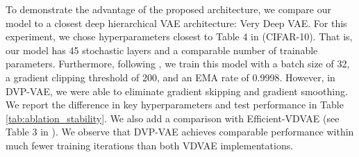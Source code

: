 To demonstrate the advantage of the proposed architecture, we compare our model to a closest deep hierarchical VAE architecture: Very Deep VAE. For this experiment, we chose hyperparameters closest to Table 4 in \cite{Child2020-ze} (CIFAR-10). That is, our model has 45 stochastic layers and a comparable number of trainable parameters. Furthermore, following \cite{Child2020-ze}, we train this model with a batch size of 32, a gradient clipping threshold of 200, and an EMA rate of 0.9998. 
However, in DVP-VAE, we were able to eliminate gradient skipping and gradient smoothing. 
We report the difference in key hyperparameters and test performance in Table \ref{tab:ablation_stability}. We also add a comparison with Efficient-VDVAE (see Table 3 in \cite{hazami2022efficientvdvae}).
We observe that DVP-VAE achieves comparable performance within much fewer training iterations than both VDVAE implementations. 


